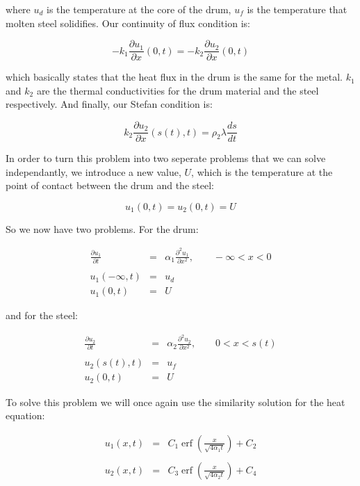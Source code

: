 \documentclass{report}
\DeclareMathOperator{\erf}{erf}
\begin{document}
where $u_d$ is the temperature at the core of the drum, $u_f$ is the temperature that molten steel 
solidifies. Our continuity of flux condition is:\bigskip

\[
  -k_1 \frac{\partial u_1}{\partial x}(0, t) = -k_2 \frac{\partial u_2}{\partial x}(0, t)
\]\medskip

which basically states that the heat flux in the drum is the same for the metal. $k_1$ and $k_2$ are the 
thermal conductivities for the drum material and the steel respectively. And finally, our Stefan condition 
is:\bigskip

\[
  k_2 \frac{\partial u_2}{\partial x} (s(t), t) = \rho_2 \lambda \frac{d s}{d t} 
\]\medskip

In order to turn this problem into two seperate problems that we can solve independantly, we introduce a 
new value, $U$, which is the temperature at the point of contact between the drum and the steel:\bigskip

\[
  u_1(0, t) = u_2(0, t) = U
\]\medskip

So we now have two problems. For the drum:\bigskip

\begin{eqnarray*} 
  \frac{\partial u_1}{\partial t} & = & \alpha_1 \frac{\partial^2 u_1}{\partial x^2}, \qquad -\infty < x < 0 \\\\
                  u_1(-\infty, t) & = & u_d \\
                        u_1(0, t) & = & U 
\end{eqnarray*}\medskip

and for the steel:\bigskip

\begin{eqnarray*} 
  \frac{\partial u_2}{\partial t} & = & \alpha_2 \frac{\partial^2 u_2}{\partial x^2}, \qquad 0 < x < s(t)  \\\\
                     u_2(s(t), t) & = & u_f \\
                        u_2(0, t) & = & U 
\end{eqnarray*}\medskip

To solve this problem we will once again use the similarity solution for the heat equation:\bigskip

\begin{eqnarray*}  
  u_1(x, t) & = & C_1 \erf \left( \frac{x}{\sqrt{4 \alpha_1 t}} \right) + C_2 \\\\
  u_2(x, t) & = & C_3 \erf \left( \frac{x}{\sqrt{4 \alpha_2 t}} \right) + C_4
\end{eqnarray*}\medskip
\end{document}
